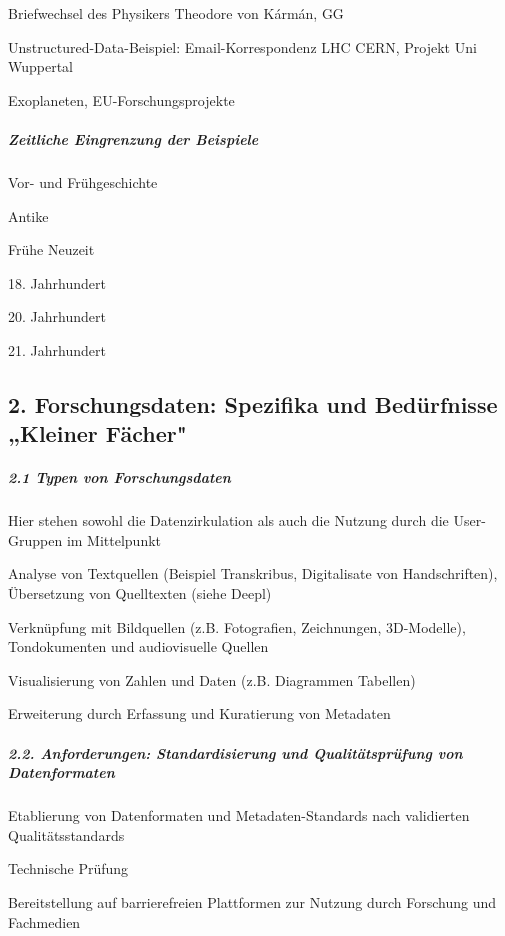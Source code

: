 Briefwechsel des Physikers Theodore von Kármán, GG

Unstructured-Data-Beispiel: Email-Korrespondenz LHC CERN, Projekt Uni
Wuppertal

Exoplaneten, EU-Forschungsprojekte

\hypertarget{zeitliche-eingrenzung-der-beispiele}{%
\subparagraph{Zeitliche Eingrenzung der
Beispiele}\label{zeitliche-eingrenzung-der-beispiele}}

Vor- und Frühgeschichte

Antike

Frühe Neuzeit

18. Jahrhundert

20. Jahrhundert

21. Jahrhundert

\hypertarget{forschungsdaten-spezifika-und-beduxfcrfnisse-kleiner-fuxe4cher}{%
\subsection{2. Forschungsdaten: Spezifika und Bedürfnisse „Kleiner
Fächer"}\label{forschungsdaten-spezifika-und-beduxfcrfnisse-kleiner-fuxe4cher}}

\hypertarget{typen-von-forschungsdaten}{%
\subparagraph{2.1 Typen von
Forschungsdaten}\label{typen-von-forschungsdaten}}

Hier stehen sowohl die Datenzirkulation als auch die Nutzung durch die
User-Gruppen im Mittelpunkt

Analyse von Textquellen (Beispiel Transkribus, Digitalisate von
Handschriften), Übersetzung von Quelltexten (siehe Deepl)

Verknüpfung mit Bildquellen (z.B. Fotografien, Zeichnungen, 3D-Modelle),
Tondokumenten und audiovisuelle Quellen

Visualisierung von Zahlen und Daten (z.B. Diagrammen Tabellen)

Erweiterung durch Erfassung und Kuratierung von Metadaten

\hypertarget{anforderungen-standardisierung-und-qualituxe4tspruxfcfung-von-datenformaten}{%
\subparagraph{2.2. Anforderungen: Standardisierung und Qualitätsprüfung
von
Datenformaten}\label{anforderungen-standardisierung-und-qualituxe4tspruxfcfung-von-datenformaten}}

Etablierung von Datenformaten und Metadaten-Standards nach validierten
Qualitätsstandards

Technische Prüfung

Bereitstellung auf barrierefreien Plattformen zur Nutzung durch
Forschung und Fachmedien
